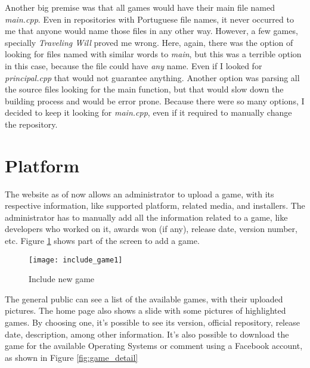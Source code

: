 Another big premise was that all games would have their main file named \textit{main.cpp}. Even in repositories with Portuguese file names, it never occurred to me that anyone would name those files in any other way. However, a few games, specially \textit{Traveling Will} proved me wrong. Here, again, there was the option of looking for files named with similar words to \textit{main}, but this was a terrible option in this case, because the file could have \textit{any} name. Even if I looked for \textit{principal.cpp} that would not guarantee anything. Another option was parsing all the source files looking for the main function, but that would slow down the building process and would be error prone. Because there were so many options, I decided to keep it looking for \textit{main.cpp}, even if it required to manually change the repository.

\section{Platform}
\label{sec:platform}

The website as of now allows an administrator to upload a game, with its respective information, like supported platform, related media, and installers.
The administrator has to manually add all the information related to a game, like developers who worked on it, awards won (if any), release date, version number, etc. Figure \ref{fig:include_game1} shows part of the screen to add a game.



\begin{figure}[h!]
\centering
\texttt{[image: include\_game1]}
\caption{Include new game}
\label{fig:include_game1}
\end{figure}

The general public can see a list of the available games, with their uploaded pictures. The home page also shows a slide with some pictures of highlighted games. By choosing one, it's possible to see its version, official repository, release date, description, among other information. It's also possible to download the game for the available Operating Systems or comment using a Facebook account, as shown in Figure \ref{fig:game_detail}

